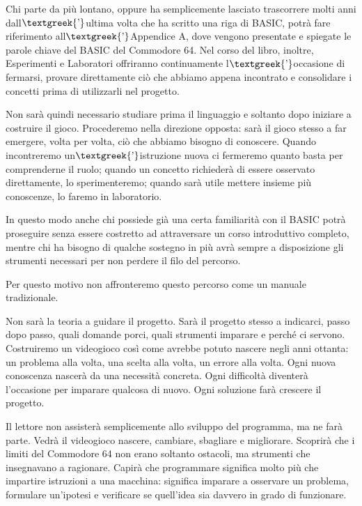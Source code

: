 \documentclass{article}
\begin{document}
Chi parte da più lontano, oppure ha semplicemente lasciato trascorrere molti anni dall$\text{\textgreek{’}}$ultima volta
che ha scritto una riga di BASIC, potrà fare riferimento all$\text{\textgreek{’}}$Appendice A, dove vengono presentate
e spiegate le parole chiave del BASIC del Commodore 64. Nel corso del libro, inoltre, Esperimenti e Laboratori
offriranno continuamente l$\text{\textgreek{’}}$occasione di fermarsi, provare direttamente ciò che abbiamo appena
incontrato e consolidare i concetti prima di utilizzarli nel progetto.

Non sarà quindi necessario studiare prima il linguaggio e soltanto dopo iniziare a costruire il gioco. Procederemo nella
direzione opposta: sarà il gioco stesso a far emergere, volta per volta, ciò che abbiamo bisogno di conoscere. Quando
incontreremo un$\text{\textgreek{’}}$istruzione nuova ci fermeremo quanto basta per comprenderne il ruolo; quando un
concetto richiederà di essere osservato direttamente, lo sperimenteremo; quando sarà utile mettere insieme più
conoscenze, lo faremo in laboratorio.

In questo modo anche chi possiede già una certa familiarità con il BASIC potrà proseguire senza essere costretto ad
attraversare un corso introduttivo completo, mentre chi ha bisogno di qualche sostegno in più avrà sempre a
disposizione gli strumenti necessari per non perdere il filo del percorso.

Per questo motivo non affronteremo questo percorso come un manuale tradizionale.

Non sarà la teoria a guidare il progetto. Sarà il progetto stesso a indicarci, passo dopo passo, quali domande porci,
quali strumenti imparare e perché ci servono. Costruiremo un videogioco così come avrebbe potuto nascere negli anni
ottanta: un problema alla volta, una scelta alla volta, un errore alla volta. Ogni nuova conoscenza nascerà da una
necessità concreta. Ogni difficoltà diventerà l'occasione per imparare qualcosa di nuovo. Ogni soluzione farà crescere
il progetto.

Il lettore non assisterà semplicemente allo sviluppo del programma, ma ne farà parte. Vedrà il videogioco nascere,
cambiare, sbagliare e migliorare. Scoprirà che i limiti del Commodore 64 non erano soltanto ostacoli, ma strumenti che
insegnavano a ragionare. Capirà che programmare significa molto più che impartire istruzioni a una macchina: significa
imparare a osservare un problema, formulare un'ipotesi e verificare se quell'idea sia davvero in grado di funzionare.
\end{document}
